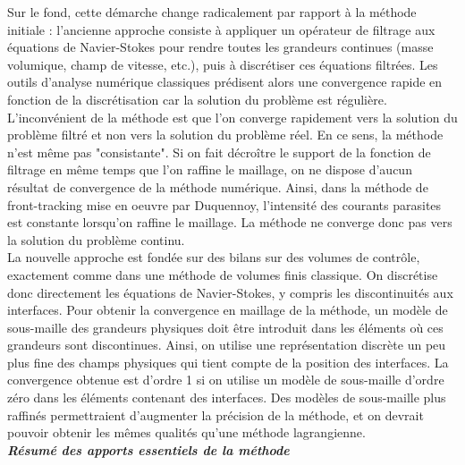 Sur le fond, cette d\'emarche change radicalement par rapport \`a la m\'ethode initiale \cite{Unverdi1992} : l'ancienne approche consiste \`a appliquer un op\'erateur de filtrage aux \'equations de Navier-Stokes pour rendre toutes
les grandeurs continues (masse volumique, champ de vitesse, etc.), puis \`a discr\'etiser ces \'equations filtr\'ees. Les outils d'analyse num\'erique classiques pr\'edisent alors une convergence rapide en fonction de la
discr\'etisation car la solution du probl\`eme est r\'eguli\`ere.\\ L'inconv\'enient de la m\'ethode est que l'on converge rapidement vers la solution du problème filtr\'e et non vers la solution du probl\`eme r\'eel. En ce sens,
la m\'ethode n'est m\^eme pas "consistante". Si on fait d\'ecroître le support de la fonction de filtrage en m\^eme temps que l'on raffine le maillage, on ne dispose d'aucun r\'esultat de convergence de la m\'ethode num\'erique. Ainsi, dans la m\'ethode de front-tracking mise en oeuvre par Duquennoy, l'intensit\'e des courants parasites est constante lorsqu'on raffine le maillage. La m\'ethode ne converge donc pas vers la solution du probl\`eme continu.\\
La nouvelle approche est fond\'ee sur des bilans sur des volumes de contr\^ole, exactement comme dans une m\'ethode de volumes finis classique. On discr\'etise donc directement les \'equations de Navier-Stokes, y compris les
discontinuit\'es aux interfaces. Pour obtenir la convergence en maillage de la m\'ethode, un mod\`ele de sous-maille des grandeurs physiques doit \^etre introduit dans les \'el\'ements o\`u ces grandeurs sont discontinues. Ainsi, on
utilise une repr\'esentation discr\`ete un peu plus fine des champs physiques qui tient compte de la position des interfaces. La convergence obtenue est d'ordre 1 si on utilise un mod\`ele de sous-maille d'ordre z\'ero dans les \'el\'ements contenant des interfaces. Des mod\`eles de sous-maille plus raffin\'es permettraient d'augmenter la pr\'ecision de la m\'ethode, et on devrait pouvoir obtenir les m\^emes qualit\'es qu'une m\'ethode lagrangienne.\smallskip \\

\textit{\textbf{R\'esum\'e des apports essentiels de la m\'ethode}}\smallskip \\

